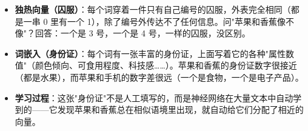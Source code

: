 \documentclass[a4paper,11pt]{ctexart}
\begin{document}
\begin{metaphorbox}
    \begin{itemize}
        \item \textbf{独热向量（囚服）}：每个词穿着一件只有自己编号的囚服，外表完全相同（都是一串 0 里有一个 1），除了编号外传达不了任何信息。问"苹果和香蕉像不像"？回答：一个是 3 号，一个是 4 号，一样的囚服，没区别。
        \item \textbf{词嵌入（身份证）}：每个词有一张丰富的身份证，上面写着它的各种"属性数值"（颜色倾向、可食用程度、科技感……）。苹果和香蕉的身份证数字很接近（都是水果），而苹果和手机的数字差很远（一个是食物，一个是电子产品）。
        \item \textbf{学习过程}：这张"身份证"不是人工填写的，而是神经网络在大量文本中自动学到的——它发现苹果和香蕉总在相似语境里出现，就自动给它们分配了相近的向量。
    \end{itemize}
\end{metaphorbox}
\end{document}

